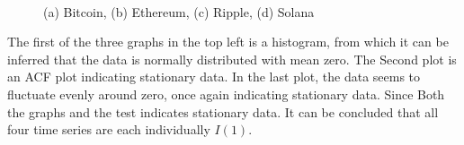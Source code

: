 \begin{figure}[H]
  \centering
  \quad
  \\
  \quad
  \caption{(a) Bitcoin, (b) Ethereum, (c) Ripple, (d) Solana }
\end{figure}
\noindent The first of the three graphs in the top left is a histogram, from which it can be inferred that the data is normally distributed with mean zero. The Second plot is an ACF plot indicating stationary data. In the last plot, the data seems to fluctuate evenly around zero, once again indicating stationary data.
Since Both the graphs and the test indicates stationary data. It can be concluded that all four time series are each individually $I(1)$.\\

